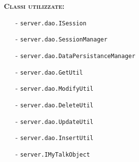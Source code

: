 \begin{description}
	\item{\scshape\bfseries Classi utilizzate:}
	\begin{itemize}[nolistsep, noitemsep]
	  \item[-] \texttt{server.dao.ISession}
	  \item[-] \texttt{server.dao.SessionManager}
	  \item[-] \texttt{server.dao.DataPersistanceManager}
	  \item[-] \texttt{server.dao.GetUtil}
	  \item[-] \texttt{server.dao.ModifyUtil}
	  \item[-] \texttt{server.dao.DeleteUtil}
	  \item[-] \texttt{server.dao.UpdateUtil}
	  \item[-] \texttt{server.dao.InsertUtil}
	  \item[-] \texttt{server.IMyTalkObject}
	  
	\end{itemize}
\end{description}

